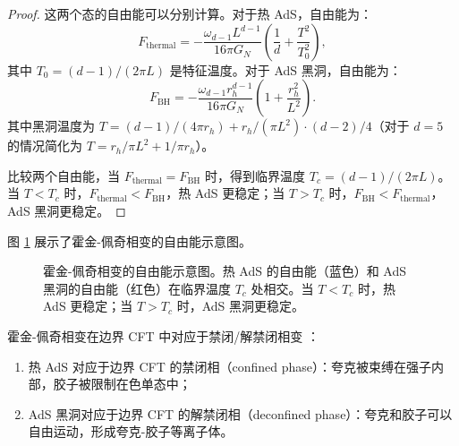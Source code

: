 \begin{proof}
这两个态的自由能可以分别计算。对于热 AdS，自由能为：
\begin{equation}
    F_{\text{thermal}} = -\frac{\omega_{d-1} L^{d-1}}{16\pi G_N} \left(\frac{1}{d} + \frac{T^2}{T_0^2}\right),
\end{equation}
其中 $T_0 = (d-1)/(2\pi L)$ 是特征温度。对于 AdS 黑洞，自由能为：
\begin{equation}
    F_{\text{BH}} = -\frac{\omega_{d-1} r_h^{d-1}}{16\pi G_N} \left(1 + \frac{r_h^2}{L^2}\right).
\end{equation}
其中黑洞温度为 $T = (d-1)/(4\pi r_h) + r_h/(\pi L^2) \cdot (d-2)/4$（对于 $d=5$ 的情况简化为 $T = r_h/\pi L^2 + 1/\pi r_h$）。

比较两个自由能，当 $F_{\text{thermal}} = F_{\text{BH}}$ 时，得到临界温度 $T_c = (d-1)/(2\pi L)$。当 $T < T_c$ 时，$F_{\text{thermal}} < F_{\text{BH}}$，热 AdS 更稳定；当 $T > T_c$ 时，$F_{\text{BH}} < F_{\text{thermal}}$，AdS 黑洞更稳定。
\end{proof}

图 \ref{fig:Hawking_Page} 展示了霍金-佩奇相变的自由能示意图。

\begin{figure}[htbp]
\centering
{}
\caption{霍金-佩奇相变的自由能示意图。热 AdS 的自由能（蓝色）和 AdS 黑洞的自由能（红色）在临界温度 $T_c$ 处相交。当 $T < T_c$ 时，热 AdS 更稳定；当 $T > T_c$ 时，AdS 黑洞更稳定。}
\label{fig:Hawking_Page}
\end{figure}

\begin{theorem}[霍金-佩奇相变的物理意义]
霍金-佩奇相变在边界 CFT 中对应于禁闭/解禁闭相变 \cite{Witten1998b}：
\begin{enumerate}
    \item 热 AdS 对应于边界 CFT 的禁闭相（confined phase）：夸克被束缚在强子内部，胶子被限制在色单态中；
    \item AdS 黑洞对应于边界 CFT 的解禁闭相（deconfined phase）：夸克和胶子可以自由运动，形成夸克-胶子等离子体。
\end{enumerate}
\end{theorem}

